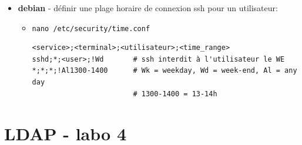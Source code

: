 \documentclass[a4paper]{article}
\begin{document}
\begin{itemize}
\item \textbf{debian} - définir une plage horaire de connexion ssh pour un utilisateur:
\begin{itemize}
    \item \texttt{nano /etc/security/time.conf}
\begin{example} \begin{verbatim}
<service>;<terminal>;<utilisateur>;<time_range>
sshd;*;<user>;!Wd       # ssh interdit à l'utilisateur le WE
*;*;*;!Al1300-1400      # Wk = weekday, Wd = week-end, Al = any day
                        # 1300-1400 = 13-14h
\end{verbatim} \end{example}
\end{itemize}


\end{itemize}















\newpage \section{LDAP - labo 4}
\end{document}
